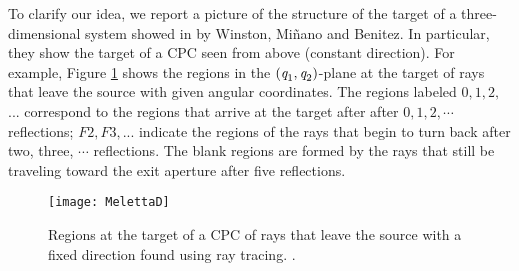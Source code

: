 To clarify our idea, we report a picture of the structure of the target of a three-dimensional system showed in \cite{winston2005nonimaging} by Winston, Mi\~nano and Benitez.
In particular, they show the target of a CPC seen from above (constant direction). For example, Figure \ref{fig:melettaC} shows the regions in the $(\textit{q}_1, \textit{q}_2)$-plane at the target of rays that leave the source with given angular coordinates. The regions labeled $0, 1, 2,$... correspond to the regions that arrive at the target after after $0, 1, 2, \cdots$ reflections; $F2, F3,$... indicate the regions of the rays that begin to turn back after two, three, $\cdots$ reflections. The blank regions are formed by the rays that
still be traveling toward the exit aperture after five reflections. 
\begin{figure}[h]
\centering
    \texttt{[image: MelettaD]}
    \caption{Regions at the target of a CPC of rays that leave the source with a fixed direction found using ray tracing. \cite{winston2005nonimaging}.}
\label{fig:melettaC}
\end{figure}
